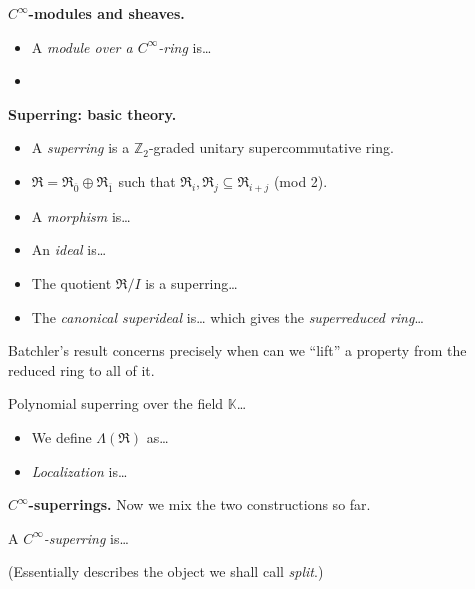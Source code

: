 \medskip\noindent
{\bf $C^\infty$-modules and sheaves.}

\begin{itemize}
\item A {\it module over a $C^\infty$-ring} 
is…
\item 
\end{itemize}

\medskip\noindent
{\bf Superring: basic theory.}

\begin{itemize}
\item A {\it superring} is a
$\mathbb{Z}_2$-graded unitary
supercommutative ring.
\item
$\mathfrak{R}=\mathfrak{R}_{\overline{0}}
\oplus \mathfrak{R}_{\overline{1}}$
such that $\mathfrak{R}_i,
\mathfrak{R}_j \subseteq
\mathfrak{R}_{i+j}$ (mod 2).
\item A {\it morphism} is…
\item An {\it ideal} is…
\item The quotient $\mathfrak{R}/I$
is a superring…
\item The {\it canonical superideal} is…
which gives the {\it superreduced ring}…
\end{itemize}

\noindent
Batchler's result concerns precisely when
can we ``lift'' a property from the reduced
ring to all of it.

\begin{example}
\label{example-polynomial-superring}
Polynomial superring over the field
$\mathbb{K}$…
\end{example}

\begin{itemize}
\item We define $\Lambda(\mathfrak{R})$
as…
\item {\it Localization} is…
\end{itemize}

\medskip\noindent
{\bf $C^\infty$-superrings.}
Now we mix the two constructions so far.

\begin{definition}
\label{definition-cinf-superring}
A {\it $C^\infty$-superring} is…
\end{definition}



\begin{proposition}
\label{proposition-superring}
(Essentially describes the object
we shall call {\it split}.)
\end{proposition}

